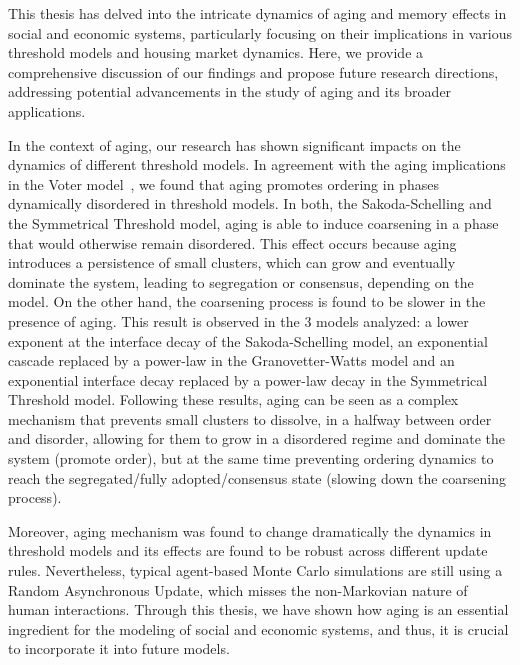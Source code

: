 This thesis has delved into the intricate dynamics of aging and memory effects in social and economic systems, particularly focusing on their implications in various threshold models and housing market dynamics. Here, we provide a comprehensive discussion of our findings and propose future research directions, addressing potential advancements in the study of aging and its broader applications.

In the context of aging, our research has shown significant impacts on the dynamics of different threshold models. In agreement with the aging implications in the Voter model~\cite{artime-2018,artime2019herding,peralta-2020C,peralta-2018,peralta-2020A}, we found that aging promotes ordering in phases dynamically disordered in threshold models. In both, the Sakoda-Schelling and the Symmetrical Threshold model, aging is able to induce coarsening in a phase that would otherwise remain disordered. This effect occurs because aging introduces a persistence of small clusters, which can grow and eventually dominate the system, leading to segregation or consensus, depending on the model. On the other hand, the coarsening process is found to be slower in the presence of aging. This result is observed in the 3 models analyzed: a lower exponent at the interface decay of the Sakoda-Schelling model, an exponential cascade replaced by a power-law in the Granovetter-Watts model and an exponential interface decay replaced by a power-law decay in the Symmetrical Threshold model. Following these results, aging can be seen as a complex mechanism that prevents small clusters to dissolve, in a halfway between order and disorder, allowing for them to grow in a disordered regime and dominate the system (promote order), but at the same time preventing ordering dynamics to reach the segregated/fully adopted/consensus state (slowing down the coarsening process). 

Moreover, aging mechanism was found to change dramatically the dynamics in threshold models and its effects are found to be robust across different update rules. Nevertheless, typical agent-based Monte Carlo simulations are still using a Random Asynchronous Update, which misses the non-Markovian nature of human interactions. Through this thesis, we have shown how aging is an essential ingredient for the modeling of social and economic systems, and thus, it is crucial to incorporate it into future models. 

